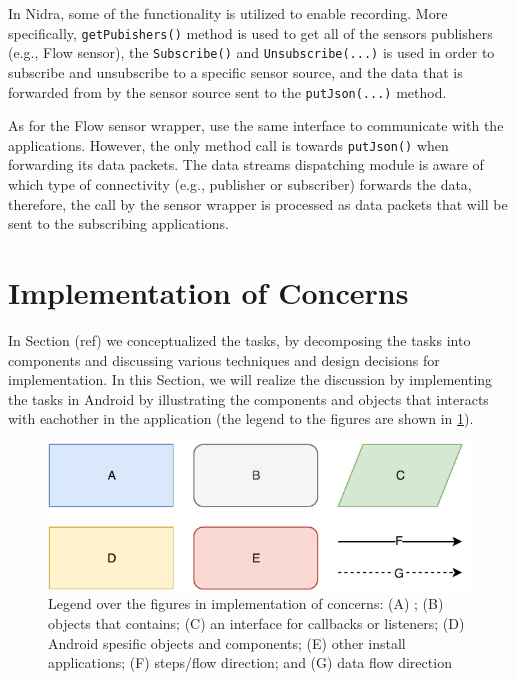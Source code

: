 In Nidra, some of the functionality is utilized to enable recording. More specifically, \verb|getPubishers()| method is used to get all of the sensors publishers (e.g., Flow sensor), the \verb|Subscribe()| and \verb|Unsubscribe(...)| is used in order to subscribe and unsubscribe to a specific sensor source, and the data that is forwarded from by the sensor source sent to the \verb|putJson(...)| method.

As for the Flow sensor wrapper, use the same interface to communicate with the applications. However, the only method call is towards \verb|putJson()| when forwarding its data packets. The data streams dispatching module is aware of which type of connectivity (e.g., publisher or subscriber) forwards the data, therefore, the call by the sensor wrapper is processed as data packets that will be sent to the subscribing applications. 

\section{Implementation of Concerns} \label{impl:ioc}
In Section (ref) we conceptualized the tasks, by decomposing the tasks into components and discussing various techniques and design decisions for implementation. In this Section, we will realize the discussion by implementing the tasks in Android by illustrating the components and objects that interacts with eachother in the application (the legend to the figures are shown in \ref{fig:legend}).

\begin{figure}[!h]
    \centering
    \includegraphics[scale=0.7]{images/Legend.pdf}
    \caption{Legend over the figures in implementation of concerns: (A) ; (B) objects that contains; (C) an interface for callbacks or listeners; (D) Android spesific objects and components; (E) other install applications; (F) steps/flow direction; and (G) data flow direction}
    \label{fig:legend}
\end{figure}



